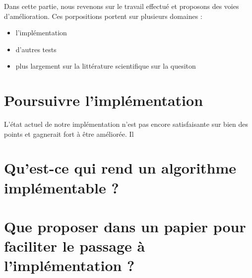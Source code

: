 Dans cette partie, nous revenons sur le travail effectué et proposons des voies d'amélioration.
Ces porpositions portent sur plusieurs domaines :
\begin{itemize}
	\item l'implémentation
	\item d'autres tests
	\item plus largement sur la littérature scientifique sur la quesiton
\end{itemize}

\section{Poursuivre l'implémentation}

	L'état actuel de notre implémentation n'est pas encore satisfaisante sur bien des points et 
	gagnerait fort à être améliorée. Il 
	


\section{Qu'est-ce qui rend un algorithme implémentable ?}

\section{Que proposer dans un papier pour faciliter le passage à l'implémentation ?}

